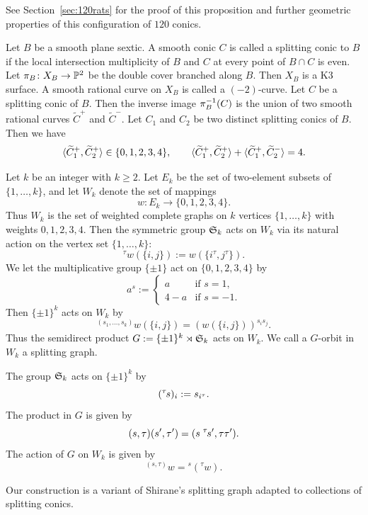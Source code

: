 \documentclass{amsart} %
\newcommand{\ps}{B}
\newcommand{\con}{C}
\newcommand{\wtcon}{\widetilde{\con}}
\newcommand{\pips}{\pi_{\ps}}
\newcommand{\Xps}{X_{\ps}}
\begin{document}
\newpage
%
%
See Section~\ref{sec:120rats} for the proof of this proposition and 
further geometric properties of this configuration of $120$ conics.
%
\par
%
Let $\ps$ be a smooth plane sextic.
A smooth conic $\con$ is called a splitting  conic to $\ps$
if the local intersection multiplicity of $\ps$ and $\con$ at every point of
$\ps\cap\con$ is even.
%
%
Let $\pips\colon\Xps\to\PP^2$ be the double cover branched along $\ps$.
Then $\Xps$ is a K3 surface.
A smooth rational curve on $\Xps$ is called a $(-2)$-curve.
Let $\con$ be a splitting conic of $\ps$.
Then 
the inverse image 
$\pips\inv (\con)$
 is the union of two smooth rational curves 
$\wtcon^+$ and $\wtcon^-$.
Let $\con_1$ and $\con_2$ be two distinct splitting conics of  $\ps$.
Then we have
\[
\intf{\wtcon_1^+, \wtcon_2^+}\in \{0,1,2,3,4\},
\qquad 
\intf{\wtcon_1^+, \wtcon_2^+}+\intf{\wtcon_1^+, \wtcon_2^-}=4.
\]
\par
Let $k$ be an integer with $k\ge 2$.
Let $E_k$ be the set of two-element subsets of $\{1,…,k\}$,
and  let
$W_k$ denote the set of mappings 
\[
w\colon E_k\to \{0,1,2,3,4\}.
\]
Thus $W_k$ is the set of weighted complete graphs on $k$ vertices $\{1, \dots, k\}$  with weights $0,1,2,3,4$.
Then the symmetric group $\mathord{\mathfrak{S}}_k$ acts on $W_k$  via its natural action on the vertex set
$\{1, \dots, k\}$:
\[
{}^\tau w (\{i, j\}):=w(\{i^\tau, j^\tau\}).
\]
We let the multiplicative group $\{\pm 1\}$ act on $ \{0,1,2,3,4\}$ by 
\[
a^s :=
\begin{cases}
a     & \text{if } s=1,\\
4-a   & \text{if } s=-1.
\end{cases}
\]
Then $\{\pm 1\}^k$ acts on $W_k$ by 
\[
{}^{(s_1, \dots, s_k)} w(\{i, j\})=(w(\{i, j\}))^{s_i s_j}.
\]
Thus the semidirect product  $G:=\{\pm 1\}^k\rtimes \mathord{\mathfrak{S}}_k$ acts on $W_k$.
We call a $G$-orbit in $W_k$ a splitting graph.
%
\begin{remark}
The group $\mathord{\mathfrak{S}}_k$ acts on $\{\pm 1\}^k$ by 
 \[
 ({}^\tau\hskip -1pt s)_i:=s_{i^\tau}.
\]
The product in  $G$ is given by
\[
(s, \tau)(s^{\prime}, \tau^{\prime})=(s \;{}^\tau \hskip -1pts^{\prime}, \tau\tau^{\prime}).
\]
The action of $G$ on $W_k$ is given by 
\[
{}^{(s, \tau)} w={}^s ({}^\tau w).
\]
\end{remark}
%
\begin{remark}
Our construction is a  variant of Shirane's
splitting graph adapted to collections of splitting conics.
\end{remark}
\end{document}
